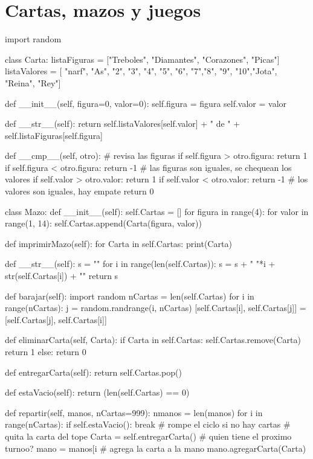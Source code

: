 \section{Cartas, mazos y juegos}

\begin{pythoncode}
import random

class Carta:
  listaFiguras = ["Treboles", "Diamantes", 
                  "Corazones", "Picas"]
  listaValores = [ "narf", "As", "2", "3", "4", "5", "6", 
               "7","8", "9", "10","Jota", "Reina", "Rey"]

  def __init__(self, figura=0, valor=0):
    self.figura = figura
    self.valor = valor

  def __str__(self):
    return self.listaValores[self.valor] + " de " 
           + self.listaFiguras[self.figura]

  def __cmp__(self, otro):
    # revisa las figuras
    if self.figura > otro.figura: 
       return 1
    if self.figura < otro.figura: 
       return -1
    # las figuras son iguales, se chequean los valores
    if self.valor > otro.valor: 
      return 1
    if self.valor < otro.valor: 
      return -1
    # los valores son iguales,  hay empate
    return 0

class Mazo:
  def __init__(self):
    self.Cartas = []
    for figura in range(4):
      for valor in range(1, 14):
        self.Cartas.append(Carta(figura, valor))

  def imprimirMazo(self):
    for Carta in self.Cartas:
      print(Carta)

  def __str__(self):
    s = ""
    for i in range(len(self.Cartas)):
      s = s + " "*i + str(self.Cartas[i]) + "\n"
    return s

  def barajar(self):
    import random
    nCartas = len(self.Cartas)
    for i in range(nCartas):
      j = random.randrange(i, nCartas)
      [self.Cartas[i], self.Cartas[j]] = [self.Cartas[j], 
                                          self.Cartas[i]]

  def eliminarCarta(self, Carta):
    if Carta in self.Cartas:
      self.Cartas.remove(Carta)
      return 1
    else: return 0

  def entregarCarta(self):
    return self.Cartas.pop()

  def estaVacio(self):
    return (len(self.Cartas) == 0)

  def repartir(self, manos, nCartas=999):
    nmanos = len(manos)
    for i in range(nCartas):
      if self.estaVacio(): 
         break    # rompe el ciclo si no hay cartas
      # quita la carta del tope
      Carta = self.entregarCarta()      
      # quien tiene el proximo turnoo?
      mano = manos[i %
      # agrega la carta a la mano
      mano.agregarCarta(Carta)         


\end{pythoncode}
